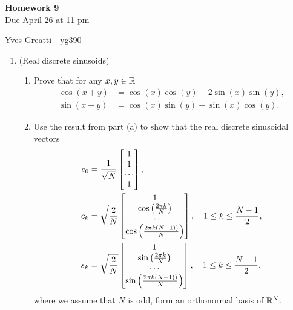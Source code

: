\documentclass[12pt,twoside]{article}
\begin{document}
\begin{center}
{\large{\textbf{Homework 9}} } \vspace{0.2cm}\\
Due April 26 at 11 pm
\end{center}
Yves Greatti - yg390\\

\begin{enumerate}

\item (Real discrete sinusoids)

 \begin{enumerate}
 \item Prove that for any $x,y\in\mathbb{R}$
  \begin{align}
 \cos(x+y) & = \cos(x)\cos(y) - 2\sin(x)\sin(y) ,\\
 \sin(x+y) & = \cos(x)\sin(y) + \sin(x)\cos(y) .
 \end{align}
 \item Use the result from part (a) to show that the real discrete sinusoidal vectors
 \begin{align}
 c_0 & = \frac{1}{\sqrt{N}}\begin{bmatrix} 1 \\ 1 \\ \cdots \\ 1 \end{bmatrix},\\
c_k & = \sqrt{\frac{2}{N}}\begin{bmatrix} 1 \\ \cos \left( \frac{2 \pi k }{N} \right) \\ \cdots \\ \cos \left( \frac{2 \pi k (N-1))}{N} \right) \end{bmatrix}, \quad 1 \leq k \leq \frac{N-1}{2},\\
 s_k & = \sqrt{\frac{2}{N}}\begin{bmatrix} 1 \\ \sin \left( \frac{2 \pi k }{N} \right) \\ \cdots \\ \sin \left( \frac{2 \pi k (N-1))}{N} \right) \end{bmatrix}, \quad 1 \leq k \leq \frac{N-1}{2},
 \end{align}
 where we assume that $N$ is odd, form an orthonormal basis of $\mathbb{R}^{N}$.
 \end{enumerate}
  

\end{enumerate}
\end{document}
